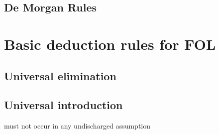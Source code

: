 \begin{multicols}{2}
\subsection*{De Morgan Rules}
\begin{fitchproof}
\end{fitchproof}
\begin{fitchproof}
\end{fitchproof}
\begin{fitchproof}
\end{fitchproof}
\begin{fitchproof}
\end{fitchproof}
\end{multicols}


\section{Basic deduction rules for FOL}

\begin{multicols}{2}
\subsection*{Universal elimination}

\begin{fitchproof}
	 
\end{fitchproof}

\subsection*{Universal introduction}

\begin{fitchproof}
	 
\end{fitchproof}
\begin{raggedright}
 must not occur in any undischarged assumption
\end{raggedright}
\end{multicols}

